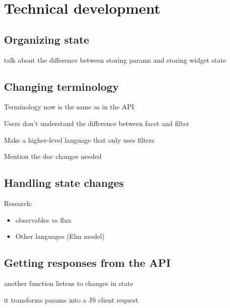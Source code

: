 
\chapter{Technical development} %
\label{chp:execution}

\section{Organizing state} %
\label{sec:organizing_state}


talk about the difference between storing params and storing widget state


\section{Changing terminology} %
\label{sec:changing_terminology}

Terminology now is the same as in the API

Users don't understand the difference between facet and filter

Make a higher-level language that only uses filters

Mention the doc changes needed


\section{Handling state changes} %
\label{sec:handling_state_changes}

Research:

\begin{itemize}
  \item observables vs flux
  \item Other languages (Elm model)\cite{csstricks-elm}
\end{itemize}


\section{Getting responses from the API} %
\label{sec:getting_responses_from_the_api}

another function listens to changes in state

it transforms params into a JS client request


